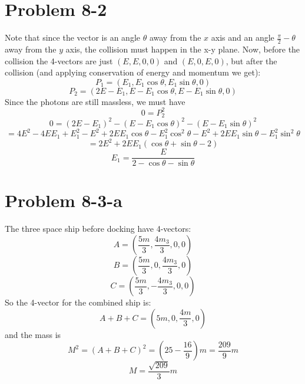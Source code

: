 \section*{Problem 8-2}
Note that since the vector is an angle $\theta$ away from the $x$ axis and an angle $\frac{\pi}{2} - \theta$ away from the $y$ axis, the collision must happen in the x-y plane. Now, 
before the collision the 4-vectors are just $(E,E,0,0)$ and $(E,0,E,0)$, but after the collision (and applying conservation of energy and momentum we get):
\[ P_1=(E_1,E_1\cos\theta,E_1\sin\theta,0) \]
\[ P_2=(2E-E_1,E-E_1\cos\theta, E-E_1\sin\theta,0) \]
Since the photons are still massless, we must have
\[ 0 = P_2^2 \]
\[ 0 = (2E-E_1)^2 - (E-E_1\cos\theta)^2 - (E-E_1\sin\theta)^2 \]\[ = 4E^2 - 4EE_1 + E_1^2 - E^2 + 2EE_1\cos\theta - E_1^2\cos^2\theta - E^2 + 2EE_1\sin\theta - E_1^2\sin^2\theta \]\[
= 2E^2 + 2EE_1(\cos\theta+\sin\theta - 2) \]
\[ \boxed{ E_1 = \frac{E}{2-\cos\theta-\sin\theta }} \]
\section*{Problem 8-3-a}
The three space ship before docking have 4-vectors:
\[ A = (\frac{5m}{3},\frac{4m_3}{3},0,0) \]
\[ B = (\frac{5m}{3},0,\frac{4m_3}{3},0) \]
\[ C = (\frac{5m}{3},-\frac{4m_3}{3},0,0) \]
So the 4-vector for the combined ship is:
\[ A+B+C = (5m,0,\frac{4m}{3},0) \]
and the mass is 
\[ M^2 = (A+B+C)^2 = (25-\frac{16}{9})m = \frac{209}{9} m \]
\[ \boxed{ M = \frac{\sqrt{209}}{3} m } \]
